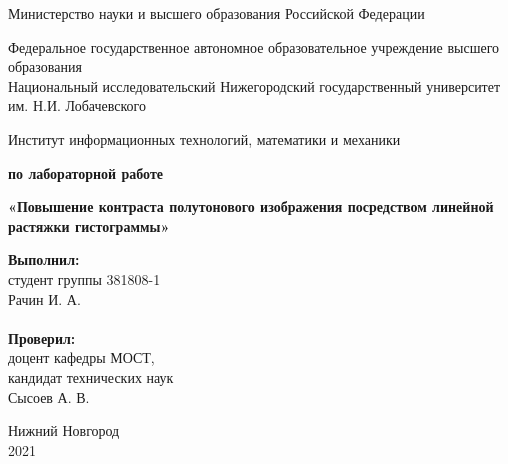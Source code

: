 \documentclass{report}
\begin{document}
\begin{titlepage}

\begin{center}
Министерство науки и высшего образования Российской Федерации
\end{center}

\begin{center}
Федеральное государственное автономное образовательное учреждение высшего образования \\
Национальный исследовательский Нижегородский государственный университет им. Н.И. Лобачевского
\end{center}

\begin{center}
Институт информационных технологий, математики и механики
\end{center}

\vspace{4em}

\begin{center}
\textbf{ по лабораторной работе} \\
\end{center}
\begin{center}
\textbf{\Large«Повышение контраста полутонового изображения посредством линейной растяжки гистограммы»} \\
\end{center}

\vspace{4em}

\newbox{\lbox}
\newlength{\maxl}
\setlength{\maxl}{\wd\lbox}
\hfill\parbox{7cm}{
\hspace*{5cm}\hspace*{-5cm}\textbf{Выполнил:} \\ студент группы 381808-1 \\ Рачин И. А.\\
\\
\hspace*{5cm}\hspace*{-5cm}\textbf{Проверил:}\\ доцент кафедры МОСТ, \\ кандидат технических наук \\ Сысоев А. В. \\
}
\vspace{\fill}

\begin{center} Нижний Новгород \\ 2021 \end{center}

\end{titlepage}
\end{document}
